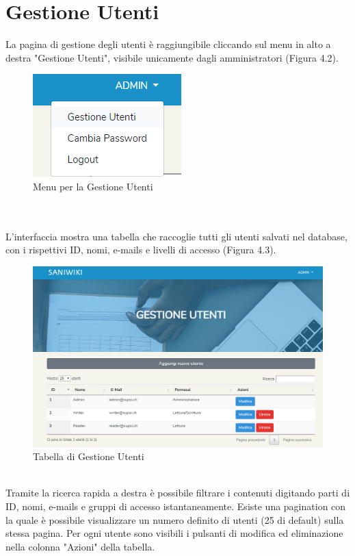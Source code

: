 \documentclass[twoside]{supsistudent}
\begin{document}
\section{Gestione Utenti}
La pagina di gestione degli utenti è raggiungibile cliccando sul menu in alto a destra "Gestione Utenti", visibile unicamente dagli amministratori (Figura 4.2).
\begin{figure}[!h]
\centering
\includegraphics[scale=0.6]{saniwiki_linkgestioneutenti.png}
\caption{Menu per la Gestione Utenti}
\end{figure}
\\\\
L'interfaccia mostra una tabella che raccoglie tutti gli utenti salvati nel database, con i rispettivi ID, nomi, e-mails e livelli di accesso (Figura 4.3).\\
\begin{figure}[!h]
\centering
\includegraphics[scale=0.4]{saniwiki_gestioneutenti.png}
\caption{Tabella di Gestione Utenti}
\end{figure}
\\
Tramite la ricerca rapida a destra è possibile filtrare i contenuti digitando parti di ID, nomi, e-mails e gruppi di accesso istantaneamente. Esiste una pagination con la quale è possibile visualizzare un numero definito di utenti (25 di default) sulla stessa pagina. Per ogni utente sono visibili i pulsanti di modifica ed eliminazione nella colonna "Azioni" della tabella.\\
\end{document}
